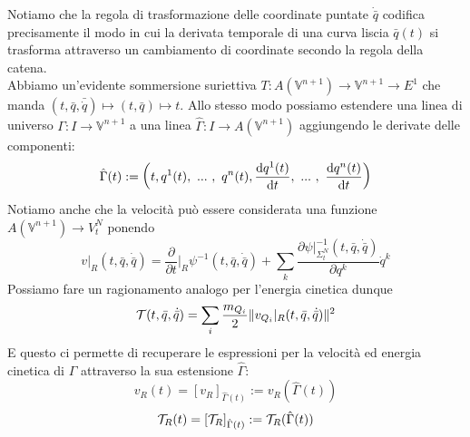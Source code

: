 \documentclass[openany]{book}
\renewcommand\V{\mathbb{V}}
\begin{document}
Notiamo che la regola di trasformazione delle coordinate puntate $\dot{\bar q}$ codifica precisamente il modo in cui la derivata temporale di una curva liscia $\bar q(t)$ si trasforma attraverso un cambiamento di coordinate secondo la regola della catena.\\
Abbiamo un'evidente sommersione suriettiva $T:A(\V^{n+1})\to \V^{n+1}\to E^1$ che manda $(t,\bar q ,\bar{\dot q})\mapsto(t,\bar q )\mapsto t$. Allo stesso modo possiamo estendere una linea di universo $\Gamma:I\to\V^{n+1}$ a una linea $\hat\Gamma:I\to A(\V^{n+1})$ aggiungendo le derivate delle componenti:
\[ \hat\Gamma(t):= \left(t, q^1(t),\ ...\ ,\ q^n(t), \frac{\text{d} q^1(t)}{\text{d} t},\ ...\ ,\  \frac{\text{d} q^n(t)}{\text{d} t}\right) \]
Notiamo anche che la velocità può essere considerata una funzione $A(\V^{n+1})\to V_t^N$ ponendo
\[ v|_R(t,\bar q,\dot{\bar q}) = \frac{\partial }{\partial t}\bigg|_R \psi^{-1}(t,\bar q,\dot{\bar q}) +\sum_k \frac{\partial \psi|_{\Sigma_t^N}^{-1}(t,\bar q,\dot{\bar q})}{\partial q^k}\dot q^k \]
Possiamo fare un ragionamento analogo per l'energia cinetica dunque 
\[ \mathcal{T}(t,\bar q,\dot{\bar q}) = \sum_i \frac{m_{Q_i}}{2} \| v_{Q_i}|_R(t,\bar q,\dot{\bar q}) \|^2 \]
E questo ci permette di recuperare le espressioni per la velocità ed energia cinetica di $\Gamma$ attraverso la sua estensione $\hat\Gamma$:
\[ v_R(t) = [v_R]_{\hat\Gamma(t)} := v_R(\hat\Gamma(t)) \]
\[ \mathcal{T}_R(t) = [\mathcal{T}_R]_{\hat\Gamma(t)} := \mathcal{T}_R(\hat\Gamma(t)) \]
\end{document}
